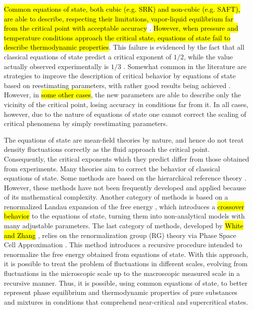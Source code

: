 \documentclass[preprint,12pt,3p]{elsarticle}
\begin{document}
	\hl{Common equations of state, both cubic (e.g. SRK) and non-cubic (e.g. SAFT), are able to describe, respecting their limitations, vapor-liquid equilibrium far from the critical point with acceptable accuracy }\cite{orbey1998modeling}. \hl{However, when pressure and temperature conditions approach the critical state, equations of state fail to describe thermodynamic properties}.  This failure is evidenced by the fact that all classical equations of state predict a critical exponent of $1/2$, while the value actually observed experimentally is $1/3$ \cite{sengers1974van, wyczalkowska2004critical, stanley1999scaling}. Somewhat common in the literature are strategies to improve the description of critical behavior by equations of state based on reestimating parameters, with rather good results being achieved \cite{palma2017re}.  However, in \hl{some other cases},  the new parameters are able to describe only the vicinity of the critical point, losing accuracy in conditions far from it. In all cases, however, due to the nature of equations of state one cannot correct the scaling of critical phenomena by simply reestimating parameters.
    
    The equations of state are mean-field theories by nature, and hence do not treat density fluctuations correctly as the fluid approach the critical point. Consequently, the critical exponents which they predict differ from those obtained from experiments. Many theories aim to correct the behavior of classical equations of state. Some methods are based on the hierarchical reference theory \cite{parola1984liquid, parola1985hierarchical, meroni1990differential, meroni1993differential}. However, these methods have not been frequently developed and applied because of its mathematical complexity. Another category of methods is based on a renormalized Landau expansion of the free energy \cite{wyczalkowska2004critical, chen1990crossover, kiselev1991universal, kiselev1998cubic, anisimov1992crossover, kiselev1999cubic, kiselev1999crossover}, which introduces a \hl{crossover behavior}  to the equations of state, turning them into non-analytical models with many adjustable parameters. The last category of methods, developed by \hl{White and Zhang}  \cite{white1993renormalization, white1995renormalization, white1998renormalization}, relies on the renormalization group (RG) theory via Phase Space Cell Approximation \cite{wilson1971renormalization, wilson1971brenormalization}. This method introduces a recursive procedure intended to renormalize the free energy obtained from equations of state. With this approach, it is possible to treat the problem of fluctuations in different scales, evolving from fluctuations in the microscopic scale up to the macroscopic measured scale in a recursive manner. Thus, it is possible, using common equations of state, to better represent phase equilibrium and thermodynamic properties of pure substances and mixtures in conditions that comprehend near-critical and supercritical states.
	
\end{document}
